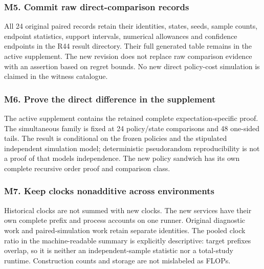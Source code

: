 \documentclass[ecta,nameyear,draft]{econsocart}
\begin{document}
\hypertarget{m5-commit-raw-direct-comparison-records}{%
\subsubsection{M5. Commit raw direct-comparison
records}\label{m5-commit-raw-direct-comparison-records}}

All 24 original paired records retain their identities, states, seeds,
sample counts, endpoint statistics, support intervals, numerical
allowances and confidence endpoints in the R44 result directory. Their
full generated table remains in the active supplement. The new revision
does not replace raw comparison evidence with an assertion based on
regret bounds. No new direct policy-cost simulation is claimed in the
witness catalogue.

\hypertarget{m6-prove-the-direct-difference-in-the-supplement}{%
\subsubsection{M6. Prove the direct difference in the
supplement}\label{m6-prove-the-direct-difference-in-the-supplement}}

The active supplement contains the retained complete
expectation-specific proof. The simultaneous family is fixed at 24
policy/state comparisons and 48 one-sided tails. The result is
conditional on the frozen policies and the stipulated independent
simulation model; deterministic pseudorandom reproducibility is not a
proof of that model\textquotesingle s independence. The new policy
sandwich has its own complete recursive order proof and comparison
class.

\hypertarget{m7-keep-clocks-nonadditive-across-environments}{%
\subsubsection{M7. Keep clocks nonadditive across
environments}\label{m7-keep-clocks-nonadditive-across-environments}}

Historical clocks are not summed with new clocks. The new services have
their own complete prefix and process accounts on one runner. Original
diagnostic work and paired-simulation work retain separate identities.
The pooled clock ratio in the machine-readable summary is explicitly
descriptive: target prefixes overlap, so it is neither an
independent-sample statistic nor a total-study runtime. Construction
counts and storage are not mislabeled as FLOPs.
\end{document}
